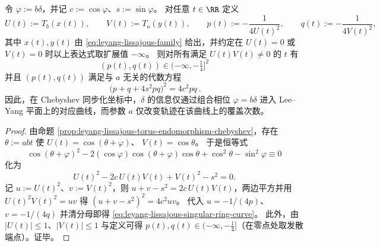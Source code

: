 \begin{theorem}\label{thm:leyang-lissajous-singular-ring-normal-form}
令 \(\varphi:=b\delta\)，并记 \(c:=\cos\varphi\)、\(s:=\sin\varphi\)。
对任意 \(t\in\RR\) 定义
\[
U(t):=T_b(x(t)),\qquad V(t):=T_a(y(t)),
\qquad
p(t):=-\frac{1}{4U(t)^2},\qquad q(t):=-\frac{1}{4V(t)^2},
\]
其中 \(x(t),y(t)\) 由 \eqref{eq:leyang-lissajous-family} 给出，并约定在 \(U(t)=0\) 或 \(V(t)=0\) 时以上表达式取扩展值 \(-\infty\)。
则对所有满足 \(U(t)V(t)\neq 0\) 的 \(t\) 有
\[
(p(t),q(t))\in(-\infty,-\tfrac14]^2
\]
并且 \((p(t),q(t))\) 满足与 \(a\) 无关的代数方程
\begin{equation}\label{eq:leyang-lissajous-singular-ring-curve}
\boxed{\ \bigl(p+q+4s^2pq\bigr)^2=4c^2pq\ }.
\end{equation}
因此，在 Chebyshev 同步化坐标中，\(\delta\) 的信息仅通过组合相位 \(\varphi=b\delta\) 进入 Lee--Yang 平面上的对应曲线，而参数 \(a\) 仅改变轨迹在该曲线上的覆盖次数。
\end{theorem}
\begin{proof}
由命题 \ref{prop:leyang-lissajous-torus-endomorphism-chebyshev}，存在 \(\theta:=abt\) 使
\(
U(t)=\cos(\theta+\varphi)
\)、
\(
V(t)=\cos\theta
\)。
于是恒等式
\[
\cos(\theta+\varphi)^2-2(\cos\varphi)\cos(\theta+\varphi)\cos\theta+\cos^2\theta-\sin^2\varphi\equiv 0
\]
化为
\[
U(t)^2-2c\,U(t)V(t)+V(t)^2-s^2=0.
\]
记 \(u:=U(t)^2\)、\(v:=V(t)^2\)，则
\(
u+v-s^2=2c\,U(t)V(t)
\)，两边平方并用 \(U(t)^2V(t)^2=uv\) 得
\(
(u+v-s^2)^2=4c^2uv
\)。
代入 \(u=-1/(4p)\)、\(v=-1/(4q)\) 并清分母即得 \eqref{eq:leyang-lissajous-singular-ring-curve}。
此外，由 \(|U(t)|\le 1\)、\(|V(t)|\le 1\) 与定义可得 \(p(t),q(t)\in(-\infty,-\tfrac14]\)（在零点处取发散端点）。证毕。
\end{proof}

